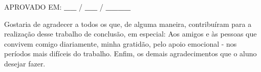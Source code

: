 \documentclass[
	12pt,				%
    oneside,			%
	a4paper,			%
	english,			%
	french,				%
	spanish,			%
	brazil,				%
	]{abntex2-modificado}
\begin{document}
\frenchspacing 


\imprimircapa

\imprimirfolhaderosto*

\begin{folhadeaprovacao}
  \begin{center}
    {\ABNTEXchapterfont\large\MakeTextUppercase\imprimirautor}
    \vspace*{\fill}\vspace*{\fill}
    \begin{center}
      \ABNTEXchapterfont\large\MakeTextUppercase\imprimirtitulo
    \end{center}
    \vspace*{\fill}
    \hspace{.45\textwidth}
    \begin{minipage}{.5\textwidth}
      \imprimirpreambulo
    \end{minipage}
    \vspace*{\fill}
  \end{center}
  APROVADO EM: \textbf{\_\_} / \textbf{\_\_} / \textbf{\_\_\_\_}
  \begin{center}
    \vspace*{0.5cm}
    {\large\imprimirlocal}
    \par
    {\large\imprimirdata}
    \vspace*{1cm}
  \end{center}
\end{folhadeaprovacao}

\begin{agradecimentos}
\begin{vplace}[0.5]
\hspace{.45\textwidth}
\begin{minipage}{.5\textwidth}
Gostaria de agradecer a todos os que, de alguma maneira, contribuíram para a realização desse trabalho de conclusão, em especial: 
Aos amigos e às pessoas que convivem comigo diariamente, minha gratidão, pelo apoio emocional - nos períodos mais difíceis do trabalho.  
Enfim, os demais agradecimentos que o aluno desejar fazer.
\end{minipage}
\end{vplace}
\end{agradecimentos}
\end{document}
